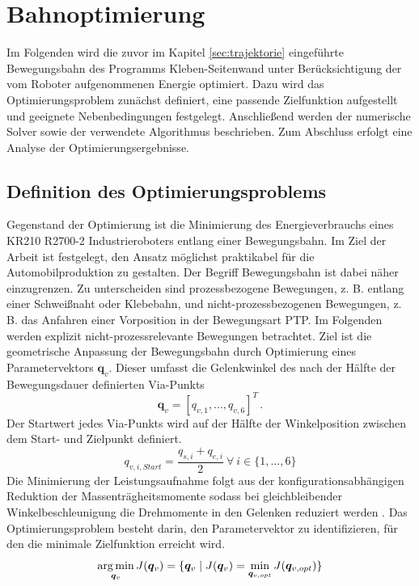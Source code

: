 \chapter{Bahnoptimierung}
\label{cha:Bahnoptimierung}
Im Folgenden wird die zuvor im Kapitel \ref{sec:trajektorie} eingeführte Bewegungsbahn des Programms Kleben-Seitenwand unter Berücksichtigung der vom Roboter aufgenommenen Energie optimiert. Dazu wird das Optimierungsproblem zunächst definiert, eine passende Zielfunktion aufgestellt und geeignete Nebenbedingungen festgelegt. Anschließend werden der numerische Solver sowie der verwendete Algorithmus beschrieben. Zum Abschluss erfolgt eine Analyse der Optimierungsergebnisse. 
%
\section{Definition des Optimierungsproblems}
Gegenstand der Optimierung ist die Minimierung des Energieverbrauchs eines KR210 R2700-2 Industrieroboters entlang einer Bewegungsbahn. Im Ziel der Arbeit ist festgelegt, den Ansatz möglichst praktikabel für die Automobilproduktion zu gestalten. Der Begriff Bewegungsbahn ist dabei näher einzugrenzen. Zu unterscheiden sind prozessbezogene Bewegungen, z. B. entlang einer Schweißnaht oder Klebebahn, und nicht-prozessbezogenen Bewegungen, z. B. das Anfahren einer Vorposition in der Bewegungsart PTP. Im Folgenden werden explizit nicht-prozessrelevante Bewegungen betrachtet. Ziel ist die geometrische Anpassung  der Bewegungsbahn durch Optimierung eines Parametervektors $\bm{q}_{v}$. Dieser umfasst die Gelenkwinkel des nach der Hälfte der Bewegungsdauer definierten Via-Punkts \cite[S~532~f.]{Ziaukas.2017}
%
\begin{equation}
	\label{eqn:parametervektor}
	\bm{q}_{v} = [q_{v,1},...,q_{v,6}]^T \,.
\end{equation}
%
Der Startwert jedes Via-Punkts wird auf der Hälfte der Winkelposition zwischen dem Start- und Zielpunkt definiert.
\begin{equation}
	\label{eqn:parametervektor-startkonfiguration}
	q_{v,i,Start} = \dfrac{q_{s,i}+q_{e,i}}{2} ~\forall~ i \in \{1,...,6\}
\end{equation}
Die Minimierung der Leistungsaufnahme folgt aus der konfigurationsabhängigen Reduktion der Massenträgheitsmomente sodass bei gleichbleibender Winkelbeschleunigung die Drehmomente in den Gelenken reduziert werden \cite[S.~531]{Ziaukas.2017}. Das Optimierungsproblem besteht darin, den Parametervektor zu identifizieren, für den die minimale Zielfunktion erreicht wird.
%
\begin{equation}
	\operatorname*{arg\,min}_{\bm{q}_{v}} J(\bm{q}_{v}) = \{\bm{q}_{v} \mid J(\bm{q}_{v}) = \min_{\bm{q}_{v,opt}} J(\bm{q}_{v,opt})\}
\end{equation}
%
